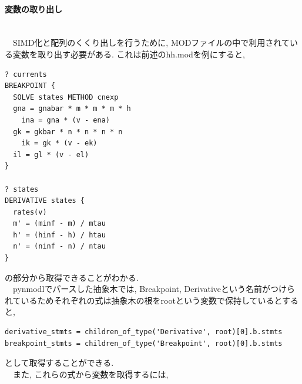 \paragraph{変数の取り出し}~\\
　SIMD化と配列のくくり出しを行うために, MODファイルの中で利用されている変数を取り出す必要がある. これは前述のhh.modを例にすると,
{\footnotesize
\begin{lstlisting}[title=Hodgikin-Huxleyモデルの計算式,label=hh-mod-calc, frame=single]
? currents
BREAKPOINT {
  SOLVE states METHOD cnexp
  gna = gnabar * m * m * m * h
	ina = gna * (v - ena)
  gk = gkbar * n * n * n * n
	ik = gk * (v - ek)
  il = gl * (v - el)
}

? states
DERIVATIVE states {
  rates(v)
  m' = (minf - m) / mtau
  h' = (hinf - h) / htau
  n' = (ninf - n) / ntau
}
\end{lstlisting}
}
の部分から取得できることがわかる.\\
　pynmodlでパースした抽象木では, Breakpoint, Derivativeという名前がつけられているためそれぞれの式は抽象木の根をrootという変数で保持しているとすると,\\
{\footnotesize
\begin{lstlisting}[title=計算式の取得,label=obtain-eq, frame=single]
derivative_stmts = children_of_type('Derivative', root)[0].b.stmts
breakpoint_stmts = children_of_type('Breakpoint', root)[0].b.stmts
\end{lstlisting}
}
として取得することができる.\\
　また, これらの式から変数を取得するには,
